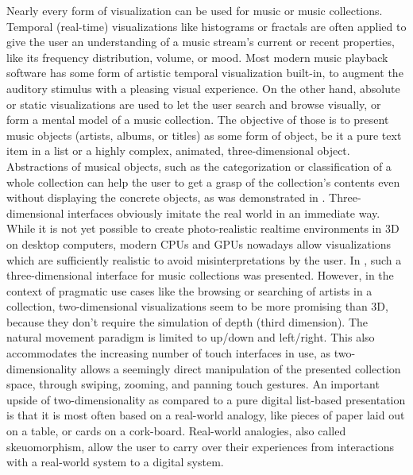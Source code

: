 Nearly every form of visualization can be used for music or music collections. Temporal (real-time) visualizations like histograms or fractals are often applied to give the user an understanding of a music stream's current or recent properties, like its frequency distribution, volume, or mood. Most modern music playback software has some form of artistic temporal visualization built-in, to augment the auditory stimulus with a pleasing visual experience. On the other hand, absolute or static visualizations are used to let the user search and browse visually, or form a mental model of a music collection. The objective of those is to present music objects (artists, albums, or titles) as some form of object, be it a pure text item in a list or a highly complex, animated, three-dimensional object. Abstractions of musical objects, such as the categorization or classification of a whole collection can help the user to get a grasp of the collection's contents even without displaying the concrete objects, as was demonstrated in \cite{Rauber:2004}. Three-dimensional interfaces obviously imitate the real world in an immediate way. While it is not yet possible to create photo-realistic realtime environments in 3D on desktop computers, modern CPUs and GPUs nowadays allow visualizations which are sufficiently realistic to avoid misinterpretations by the user. In \cite{Dittenbach:2007}, such a three-dimensional interface for music collections was presented. However, in the context of pragmatic use cases like the browsing or searching of artists in a collection, two-dimensional visualizations seem to be more promising than 3D, because they don't require the simulation of depth (third dimension). The natural movement paradigm is limited to up/down and left/right. This also accommodates the increasing number of touch interfaces in use, as two-dimensionality allows a seemingly direct manipulation of the presented collection space, through swiping, zooming, and panning touch gestures. An important upside of two-dimensionality as compared to a pure digital list-based presentation is that it is most often based on a real-world analogy, like pieces of paper laid out on a table, or cards on a cork-board. Real-world analogies, also called skeuomorphism, allow the user to carry over their experiences from interactions with a real-world system to a digital system.

